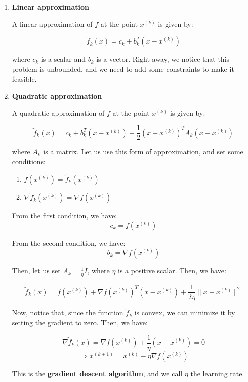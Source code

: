 \begin{enumerate}
    \item \textbf{Linear approximation}
    
    A linear approximation of $f$ at the point $x^{(k)}$ is given by:

    $$\tilde{f}_k(x) = c_k + b_k^T (x - x^{(k)})$$

    where $c_k$ is a scalar and $b_k$ is a vector. Right away, we notice that this problem
    is unbounded, and we need to add some constraints to make it feasible.\\

    \item \textbf{Quadratic approximation}
    
    A quadratic approximation of $f$ at the point $x^{(k)}$ is given by:

    $$\tilde{f}_k(x) = c_k + b_k^T (x - x^{(k)}) + \frac{1}{2} (x - x^{(k)})^T A_k (x - x^{(k)})$$

    where $A_k$ is a matrix. Let us use this form of approximation, and set some conditions:

    \begin{enumerate}
        \item $f(x^{(k)}) = \tilde{f}_k(x^{(k)})$
        \item $\nabla \tilde{f}_k(x^{(k)}) = \nabla f(x^{(k)})$
    \end{enumerate}

    From the first condition, we have:
    $$c_k = f(x^{(k)})$$

    From the second condition, we have:
    $$b_k = \nabla f(x^{(k)})$$

    Then, let us set $A_k = \frac{1}{\eta} I$, where $\eta$ is a positive scalar. Then,
    we have:

    $$\tilde{f}_k(x) = f(x^{(k)}) + \nabla f(x^{(k)})^T (x - x^{(k)}) + \frac{1}{2 \eta} \| x - x^{(k)} \|^2$$

    Now, notice that, since the function $\tilde{f}_k$ is convex, we can minimize it by
    setting the gradient to zero. Then, we have:

    $$\nabla \tilde{f}_k(x) = \nabla f(x^{(k)}) + \frac{1}{\eta} (x - x^{(k)}) = 0$$
    $$\Rightarrow x^{(k+1)} = x^{(k)} - \eta \nabla f(x^{(k)})$$

    This is the \textbf{gradient descent algorithm}, and we call $\eta$ the learning rate.\\
\end{enumerate}

